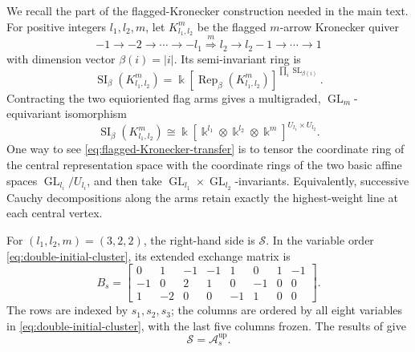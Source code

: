 \documentclass[11pt,reqno]{amsart}
\numberwithin{equation}{section}
\theoremstyle{remark}
\newcommand{\kk}{\Bbbk}
\newcommand{\SR}{\mathscr S}
\newcommand{\Asup}{\mathcal A_s^{\mathrm{up}}}
\newcommand{\GL}{\operatorname{GL}}
\newcommand{\SL}{\operatorname{SL}}
\newcommand{\Rep}{\operatorname{Rep}}
\newcommand{\SI}{\operatorname{SI}}
\begin{document}
We recall the part of the flagged-Kronecker construction needed in the main
text.  For positive integers $l_1,l_2,m$, let $K_{l_1,l_2}^m$ be the
flagged $m$-arrow Kronecker quiver
\[ -1\longrightarrow-2\longrightarrow\cdots\longrightarrow-l_1 \overset{m}{\Longrightarrow} l_2\longrightarrow l_2-1\longrightarrow\cdots\longrightarrow1 \]
with dimension vector $\beta(i)=|i|$.  Its semi-invariant ring is
\[ \SI_\beta(K_{l_1,l_2}^m) =\kk[\Rep_\beta(K_{l_1,l_2}^m)]^{\prod_i\SL_{\beta(i)}}. \]
Contracting the two equioriented flag arms gives a multigraded,
$\GL_m$-equivariant isomorphism
\begin{equation}
\label{eq:flagged-Kronecker-transfer}
 \SI_\beta(K_{l_1,l_2}^m)
 \cong
 \kk[\kk^{l_1}\otimes\kk^{l_2}\otimes\kk^m]^{U_{l_1}\times U_{l_2}}.
\end{equation}
One way to see \eqref{eq:flagged-Kronecker-transfer} is to tensor the
coordinate ring of the central representation space with the coordinate
rings of the two basic affine spaces $\GL_{l_i}/U_{l_i}$, and then take
$\GL_{l_1}\times\GL_{l_2}$-invariants.  Equivalently, successive Cauchy
decompositions along the arms retain exactly the highest-weight line at each
central vertex.

For $(l_1,l_2,m)=(3,2,2)$, the right-hand side is
$\SR$.  In the variable order
\eqref{eq:double-initial-cluster}, its extended exchange matrix is
\begin{equation*}
 B_s=
 \begin{bmatrix}
  0& 1&-1&-1& 1& 0& 1&-1\\
 -1& 0& 2& 1& 0&-1& 0& 0\\
  1&-2& 0& 0&-1& 1& 0& 0
 \end{bmatrix}.
\end{equation*}
The rows are indexed by $s_1,s_2,s_3$; the columns are ordered by
all eight variables in \eqref{eq:double-initial-cluster}, with the last five
columns frozen.  The results
of \cite{Fk1,Fk2} give
\[ \SR=\Asup. \]
\end{document}
